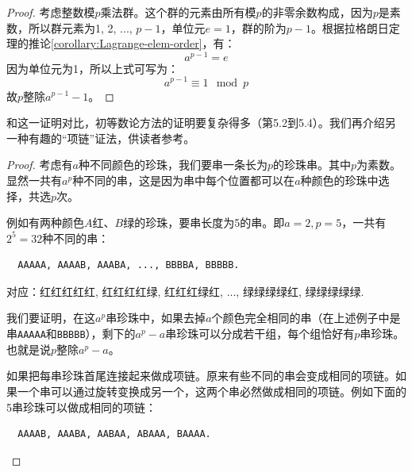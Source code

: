 \documentclass[b5paper]{ctexart}
\begin{document}
\begin{proof}
考虑整数模$p$乘法群。这个群的元素由所有模$p$的非零余数构成，因为$p$是素数，所以群元素为1, 2, ..., $p-1$，单位元$e = 1$，群的阶为$p-1$。根据拉格朗日定理的推论\ref{corollary:Lagrange-elem-order}，有：
\[
a^{p-1} = e
\]
因为单位元为1，所以上式可写为：
\[
a^{p-1} \equiv 1 \mod p
\]
故$p$整除$a^{p-1} - 1$。
\end{proof}

和这一证明对比，初等数论方法的证明要复杂得多（\cite{StepanovRose15}第5.2到5.4）。我们再介绍另一种有趣的“项链”证法\cite{Wiki-FLT-proof}，供读者参考。

\begin{proof}
考虑有$a$种不同颜色的珍珠，我们要串一条长为$p$的珍珠串。其中$p$为素数。显然一共有$a^p$种不同的串，这是因为串中每个位置都可以在$a$种颜色的珍珠中选择，共选$p$次。

例如有两种颜色$A$红、$B$绿的珍珠，要串长度为5的串。即$a = 2, p = 5$，一共有$2^5 = 32$种不同的串：

\begin{verbatim}
  AAAAA, AAAAB, AAABA, ..., BBBBA, BBBBB.
\end{verbatim}

对应：红红红红红, 红红红红绿, 红红红绿红, ..., 绿绿绿绿红, 绿绿绿绿绿.

我们要证明，在这$a^p$串珍珠中，如果去掉$a$个颜色完全相同的串（在上述例子中是串\texttt{AAAAA}和\texttt{BBBBB}），剩下的$a^p - a$串珍珠可以分成若干组，每个组恰好有$p$串珍珠。也就是说$p$整除$a^p - a$。

如果把每串珍珠首尾连接起来做成项链。原来有些不同的串会变成相同的项链。如果一个串可以通过旋转变换成另一个，这两个串必然做成相同的项链。例如下面的5串珍珠可以做成相同的项链：

\begin{verbatim}
  AAAAB, AAABA, AABAA, ABAAA, BAAAA.
\end{verbatim}


\end{proof}
\end{document}
